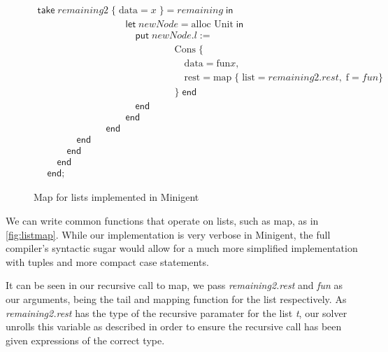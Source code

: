 \begin{figure}
\[\begin{array}{l}
\textsf{take}\; remaining2\; \{\; \text{data} = x\; \} = remaining\; \textsf{in}  \\
\hspace{9em} 
\textsf{let}\; newNode = \text{alloc Unit}\; \textsf{in} \\
\hspace{10em} 
\textsf{put}\; newNode.l :=  \\
\hspace{14em} 
\text{Cons}\; \{ \\
\hspace{15em}
\text{data} = \text{fun} x, \\
\hspace{15em} 
\text{rest} = \text{map}\; \{\; \text{list} = remaining2.rest,\; \text{f} = fun \} \\
\hspace{14em} 
\}\; \textsf{end} \\
\hspace{10em} 
\textsf{end} \\
\hspace{9em} 
\textsf{end} \\
\hspace{7em} 
\textsf{end} \\
\hspace{4em} 
\textsf{end} \\
\hspace{3em} 
\textsf{end} \\
\hspace{2em} 
\textsf{end} \\
\hspace{1em} 
\textsf{end};
        
    \end{array}    
    \]
    
    \caption{Map for lists implemented in Minigent}
    \label{fig:listmap}
\end{figure}

We can write common functions that operate on lists, such as \textsf{map},
as in \autoref{fig:listmap}. While our implementation is very verbose in Minigent,
the full compiler's syntactic sugar would allow for a much more simplified
implementation with tuples and more compact \textsf{case} statements.

It can be seen in our recursive call to map, we pass \textit{remaining2.rest} and
\textit{fun} as our arguments, being the tail and mapping function for the list
respectively. As \textit{remaining2.rest} has the type of the recursive paramater
for the list \textit{t}, our solver unrolls this variable as described in order
to ensure the recursive call has been given expressions of the correct type.

